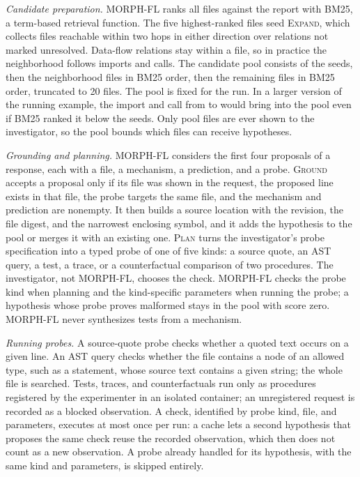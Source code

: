 \documentclass[letterpaper,journal]{IEEEtran}
\newcommand{\tool}{MORPH-FL}
\newcommand{\code}[1]{\texttt{\detokenize{#1}}}
\begin{document}
\emph{Candidate preparation.} \tool{} ranks all files against the report with BM25, a term-based retrieval function. The five highest-ranked files seed \textsc{Expand}, which collects files reachable within two hops in either direction over relations not marked unresolved. Data-flow relations stay within a file, so in practice the neighborhood follows imports and calls. The candidate pool consists of the seeds, then the neighborhood files in BM25 order, then the remaining files in BM25 order, truncated to 20 files. The pool is fixed for the run. In a larger version of the running example, the import and call from \code{handle} to \code{normalize} would bring \code{config.py} into the pool even if BM25 ranked it below the seeds. Only pool files are ever shown to the investigator, so the pool bounds which files can receive hypotheses.

\emph{Grounding and planning.} \tool{} considers the first four proposals of a response, each with a file, a mechanism, a prediction, and a probe. \textsc{Ground} accepts a proposal only if its file was shown in the request, the proposed line exists in that file, the probe targets the same file, and the mechanism and prediction are nonempty. It then builds a source location with the revision, the file digest, and the narrowest enclosing symbol, and it adds the hypothesis to the pool or merges it with an existing one. \textsc{Plan} turns the investigator's probe specification into a typed probe of one of five kinds: a source quote, an AST query, a test, a trace, or a counterfactual comparison of two procedures. The investigator, not \tool{}, chooses the check. \tool{} checks the probe kind when planning and the kind-specific parameters when running the probe; a hypothesis whose probe proves malformed stays in the pool with score zero. \tool{} never synthesizes tests from a mechanism.

\emph{Running probes.} A source-quote probe checks whether a quoted text occurs on a given line. An AST query checks whether the file contains a node of an allowed type, such as a \code{return} statement, whose source text contains a given string; the whole file is searched. Tests, traces, and counterfactuals run only as procedures registered by the experimenter in an isolated container; an unregistered request is recorded as a blocked observation. A check, identified by probe kind, file, and parameters, executes at most once per run: a cache lets a second hypothesis that proposes the same check reuse the recorded observation, which then does not count as a new observation. A probe already handled for its hypothesis, with the same kind and parameters, is skipped entirely.
\end{document}
